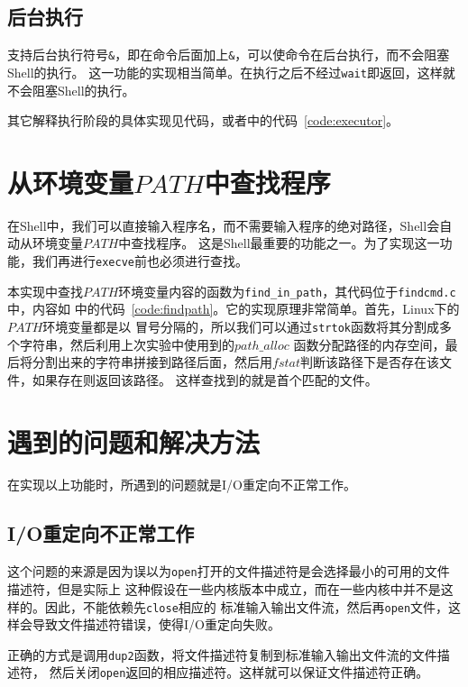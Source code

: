 \documentclass[a4paper,twoside]{article}
\begin{document}
\begin{spacing}{1.2}
\subsection{后台执行}

支持后台执行符号\texttt{\&}，即在命令后面加上\texttt{\&}，可以使命令在后台执行，而不会阻塞Shell的执行。
这一功能的实现相当简单。在执行之后不经过\texttt{wait}即返回，这样就不会阻塞Shell的执行。

其它解释执行阶段的具体实现见代码，或者中的代码~\ref{code:executor}。


\section{从环境变量$PATH$中查找程序}

在Shell中，我们可以直接输入程序名，而不需要输入程序的绝对路径，Shell会自动从环境变量$PATH$中查找程序。
这是Shell最重要的功能之一。为了实现这一功能，我们再进行\texttt{execve}前也必须进行查找。

本实现中查找$PATH$环境变量内容的函数为\texttt{find\_in\_path}，其代码位于\texttt{findcmd.c}中，内容如
中的代码~\ref*{code:findpath}。它的实现原理非常简单。首先，Linux下的$PATH$环境变量都是以
冒号分隔的，所以我们可以通过\texttt{strtok}函数将其分割成多个字符串，然后利用上次实验中使用到的$path\_alloc$
函数分配路径的内存空间，最后将分割出来的字符串拼接到路径后面，然后用$fstat$判断该路径下是否存在该文件，如果存在则返回该路径。
这样查找到的就是首个匹配的文件。

\section{遇到的问题和解决方法}

在实现以上功能时，所遇到的问题就是I/O重定向不正常工作。

\subsection{I/O重定向不正常工作}

这个问题的来源是因为误以为\texttt{open}打开的文件描述符是会选择最小的可用的文件描述符，但是实际上
这种假设在一些内核版本中成立，而在一些内核中并不是这样的。因此，不能依赖先\texttt{close}相应的
标准输入输出文件流，然后再\texttt{open}文件，这样会导致文件描述符错误，使得I/O重定向失败。

正确的方式是调用\texttt{dup2}函数，将文件描述符复制到标准输入输出文件流的文件描述符，
然后关闭\texttt{open}返回的相应描述符。这样就可以保证文件描述符正确。


\end{spacing}
\end{document}
